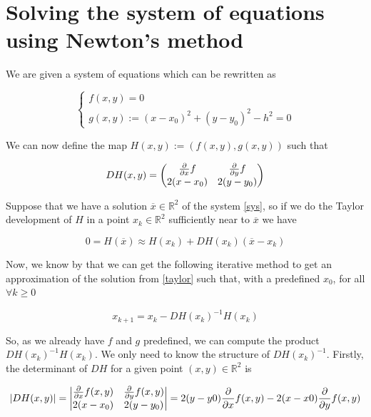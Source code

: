 \documentclass[11pt]{article}
\begin{document}
\section{Solving the system of equations using Newton's method}

We are given a system of equations which can be rewritten as 

\begin{equation}
    \label{sys}
    \begin{cases}
        f(x, y) = 0 \\
        g(x, y) := (x - x_0)^2 + (y - y_0)^2 - h^2 = 0
    \end{cases}
\end{equation}

We can now define the map $H(x, y) := (f(x, y), g(x, y))$ such that

\begin{equation}
DH(x, y) = 
\begin{pmatrix}
    \df{x}     & \df{y} \\
    2(x - x_0) & 2(y - y_0)
\end{pmatrix}
\end{equation}

Suppose that we have a solution $\overline{x} \in \mathbb{R}^2$ of the system \ref{sys}, so if we do the Taylor development of $H$ in a 
point $x_k \in \mathbb{R}^2$ sufficiently near to $\overline{x}$ we have

\begin{equation}
    \label{taylor}
    0 = H (\overline{x}) \approx H(x_k) + DH(x_k)(\overline{x} − x_k)
\end{equation}

Now, we know by \cite[Equation 3.1]{MN2:1} that we can get the following iterative method to get an approximation of the solution from \ref{taylor} such that, with a predefined $x_0$, for all $\forall k \geq 0$

\begin{equation}
    \label{newton}
    x_{k+1} = x_k - DH(x_k)^{-1} H(x_k)
\end{equation}

So, as we already have $f$ and $g$ predefined, we can compute the product $DH(x_k)^{-1} H(x_k)$.
We only need to know the structure of $DH(x_k)^{-1}$.
Firstly, the determinant of $DH$ for a given point $(x, y) \in \mathbb{R}^2$ is 

\begin{equation}
|DH(x, y)| = 
\begin{vmatrix}
    \df{x}(x, y)     & \df{y}(x, y) \\
    2(x - x_0) & 2(y - y_0)
\end{vmatrix}
=
2 (y - y0) \df{x}(x, y) -
2 (x - x0) \df{y}(x, y)
\end{equation}
\end{document}
